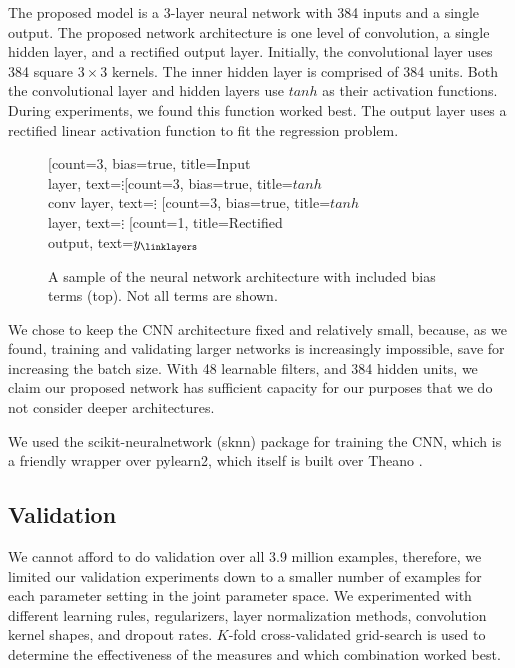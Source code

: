 \documentclass{article}
\begin{document}
The proposed model is a 3-layer neural network with 384 inputs and a single output.  The proposed network architecture is one level of convolution, a single hidden layer, and a rectified output layer.  Initially, the convolutional layer uses 384 square $3\times3$ kernels.  The inner hidden layer is comprised of 384 units.  Both the convolutional layer and hidden layers use $tanh$ as their activation functions.  During experiments, we found this function worked best.  The output layer uses a rectified linear activation function to fit the regression problem.

\begin{figure}[ht]
\centering
\begin{neuralnetwork}[height=4]
	\newcommand{\nodetexty}[2]{$y_#2$}
	\newcommand{\mynodetext}[2]{$\vdots$}
	\setdefaultnodetext{\mynodetext}
	[count=3, bias=true, title=Input\\layer, text=\mynodetext]
	\hiddenlayer[count=3, bias=true, title=$tanh$\\conv layer, text=\mynodetext] \linklayers
	\hiddenlayer[count=3, bias=true, title=$tanh$\\layer, text=\mynodetext] \linklayers
	\outputlayer[count=1, title=Rectified\\output, text=\nodetexty] \linklayers
\end{neuralnetwork}
\caption{A sample of the neural network architecture with included bias terms (top).  Not all terms are shown.}
\end{figure}

We chose to keep the CNN architecture fixed and relatively small, because, as we found, training and validating larger networks is increasingly impossible, save for increasing the batch size.  With 48 learnable filters, and 384 hidden units, we claim our proposed network has sufficient capacity for our purposes that we do not consider deeper architectures.

We used the scikit-neuralnetwork (sknn) package for training the CNN, which is a friendly wrapper over pylearn2, which itself is built over Theano \cite{theano}.

\subsection{Validation}

We cannot afford to do validation over all 3.9 million examples, therefore, we limited our validation experiments down to a smaller number of examples for each parameter setting in the joint parameter space.  We experimented with different learning rules, regularizers, layer normalization methods, convolution kernel shapes, and dropout rates.  $K$-fold cross-validated grid-search is used to determine the effectiveness of the measures and which combination worked best.
\end{document}
